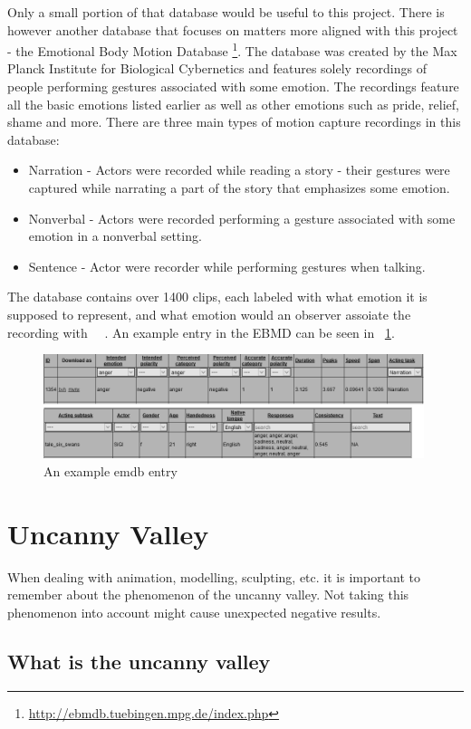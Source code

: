 Only a small portion of that database would be useful to this project. There is however another database that focuses on matters more aligned with this project - the Emotional Body Motion Database \footnote{\url{http://ebmdb.tuebingen.mpg.de/index.php}}. The database was created by the Max Planck Institute for Biological Cybernetics and features solely recordings of people performing gestures associated with some emotion. The recordings feature all the basic emotions listed earlier as well as other emotions such as pride, relief, shame and more. There are three main types of motion capture recordings in this database:
\begin{itemize}
\item Narration - Actors were recorded while reading a story - their gestures were captured while narrating a part of the story that emphasizes some emotion.
\item Nonverbal - Actors were recorded performing a gesture associated with some emotion in a nonverbal setting.
\item Sentence - Actor were recorder while performing gestures when talking.
\end{itemize}
The database contains over 1400 clips, each labeled with what emotion it is supposed to represent, and what emotion would an observer assoiate the recording with ~\cite{planck1}~\cite{planck2}. An example entry in the EBMD can be seen in ~\ref{fig:ebmd1}.

\begin{figure}[!ht]
\centerline{\includegraphics[width = 30em]{img/emo1.png}}
\caption{An example emdb entry}\label{fig:ebmd1}
\end{figure}


\section{Uncanny Valley}

When dealing with animation, modelling, sculpting, etc. it is important to remember about the phenomenon of the uncanny valley. Not taking this phenomenon into account might cause unexpected negative results.

\subsection{What is the uncanny valley}

